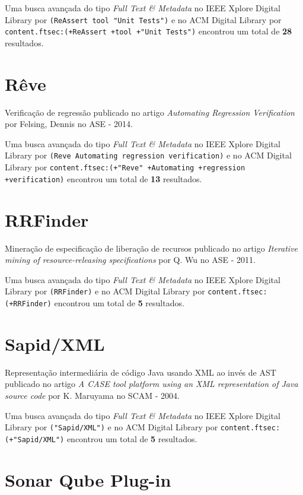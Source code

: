 Uma busca avançada do tipo {\it Full Text \& Metadata} no IEEE Xplore Digital Library por
\texttt{(ReAssert tool "Unit Tests")}
e no ACM Digital Library por
\texttt{content.ftsec:(+ReAssert +tool +"Unit Tests")}
encontrou um total de
{\bf 28}
resultados.

\section{Rêve}

Verificação de regressão
publicado no artigo
{\it Automating Regression Verification}
por
Felsing, Dennis
no
ASE
-
2014.


Uma busca avançada do tipo {\it Full Text \& Metadata} no IEEE Xplore Digital Library por
\texttt{(Reve Automating regression verification)}
e no ACM Digital Library por
\texttt{content.ftsec:(+"Reve" +Automating +regression +verification)}
encontrou um total de
{\bf 13}
resultados.

\section{RRFinder}

Mineração de especificação de liberação de recursos
publicado no artigo
{\it Iterative mining of resource-releasing specifications}
por
Q. Wu
no
ASE
-
2011.


Uma busca avançada do tipo {\it Full Text \& Metadata} no IEEE Xplore Digital Library por
\texttt{(RRFinder)}
e no ACM Digital Library por
\texttt{content.ftsec:(+RRFinder)}
encontrou um total de
{\bf 5}
resultados.

\section{Sapid/XML}

Representação intermediária de código Java usando XML ao invés de AST
publicado no artigo
{\it A CASE tool platform using an XML representation of Java source code}
por
K. Maruyama
no
SCAM
-
2004.


Uma busca avançada do tipo {\it Full Text \& Metadata} no IEEE Xplore Digital Library por
\texttt{("Sapid/XML")}
e no ACM Digital Library por
\texttt{content.ftsec:(+"Sapid/XML")}
encontrou um total de
{\bf 5}
resultados.

\section{Sonar Qube Plug-in}


